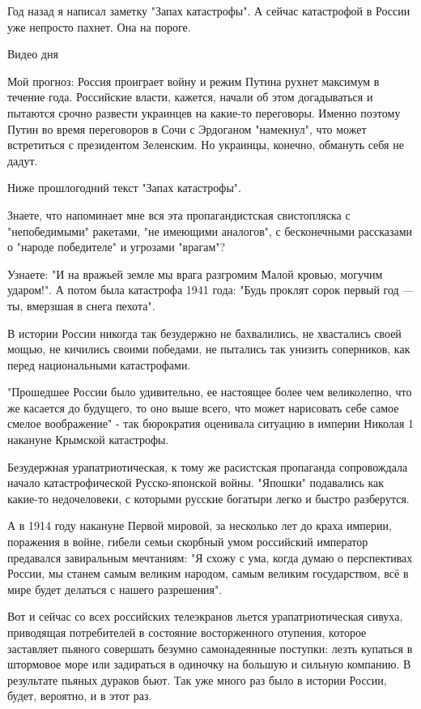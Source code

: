  
 
 
 
 

Год назад я написал заметку "Запах катастрофы". А сейчас катастрофой в России
уже непросто пахнет. Она на пороге.

Видео дня

Мой прогноз: Россия проиграет войну и режим Путина рухнет максимум в течение
года. Российские власти, кажется, начали об этом догадываться и пытаются срочно
развести украинцев на какие-то переговоры. Именно поэтому Путин во время
переговоров в Сочи с Эрдоганом "намекнул", что может встретиться с президентом
Зеленским. Но украинцы, конечно, обмануть себя не дадут.

Ниже прошлогодний текст "Запах катастрофы".

Знаете, что напоминает мне вся эта пропагандистская свистопляска с
"непобедимыми" ракетами, "не имеющими аналогов", с бесконечными рассказами о
"народе победителе" и угрозами "врагам"?

Узнаете: "И на вражьей земле мы врага разгромим
Малой кровью, могучим ударом!".
А потом была катастрофа 1941 года: "Будь проклят
сорок первый год —
ты, вмерзшая в снега пехота".

В истории России никогда так безудержно не бахвалились, не хвастались своей
мощью, не кичились своими победами, не пытались так унизить соперников, как
перед национальными катастрофами.

"Прошедшее России было удивительно, ее настоящее более чем великолепно, что же
касается до будущего, то оно выше всего, что может нарисовать себе самое смелое
воображение" - так бюрократия оценивала ситуацию в империи Николая 1 накануне
Крымской катастрофы.

Безудержная урапатриотическая, к тому же расистская пропаганда сопровождала
начало катастрофической Русско-японской войны. "Япошки" подавались как какие-то
недочеловеки, с которыми русские богатыри легко и быстро разберутся.

А в 1914 году накануне Первой мировой, за несколько лет до краха империи,
поражения в войне, гибели семьи скорбный умом российский император предавался
завиральным мечтаниям: "Я схожу с ума, когда думаю о перспективах России, мы
станем самым великим народом, самым великим государством, всё в мире будет
делаться с нашего разрешения".

Вот и сейчас со всех российских телеэкранов льется урапатриотическая сивуха,
приводящая потребителей в состояние восторженного отупения, которое заставляет
пьяного совершать безумно самонадеянные поступки: лезть купаться в штормовое
море или задираться в одиночку на большую и сильную компанию. В результате
пьяных дураков бьют. Так уже много раз было в истории России, будет, вероятно,
и в этот раз.
